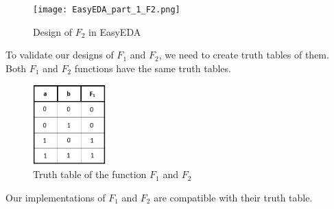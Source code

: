 \documentclass[pdftex,12pt,a4paper]{article}
\begin{document}
\begin{itemize}
   \begin{figure}[H]
    \centering
        \texttt{[image: EasyEDA\_part\_1\_F2.png]}	
        \caption{Design of \textbf{$F_2$} in EasyEDA}
   \end{figure}
   
    \newpage
   To validate our designs of $F_1$ and $F_2$, we need to create truth tables of them. Both $F_1$ and $F_2$ functions have the same truth tables.\\
   \begin{figure}[H]
    \centering
        \includegraphics[width=0.25\textwidth]{f1truth.png}	
        \caption{Truth table of the function \textbf{$F_1$} and \textbf{$F_2$}}
   \end{figure}
   Our implementations of $F_1$ and $F_2$ are compatible with their truth table.\\
   
\end{itemize}
\end{document}

